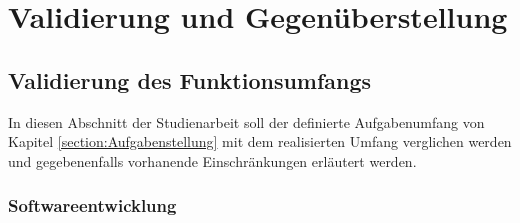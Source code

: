 
\chapter{Validierung und Gegenüberstellung}


\section{Validierung des Funktionsumfangs}

In diesen Abschnitt der Studienarbeit soll der definierte Aufgabenumfang von Kapitel \ref{section:Aufgabenstellung} mit dem realisierten Umfang verglichen werden und gegebenenfalls vorhanende Einschränkungen erläutert werden.

\subsection{Softwareentwicklung}



